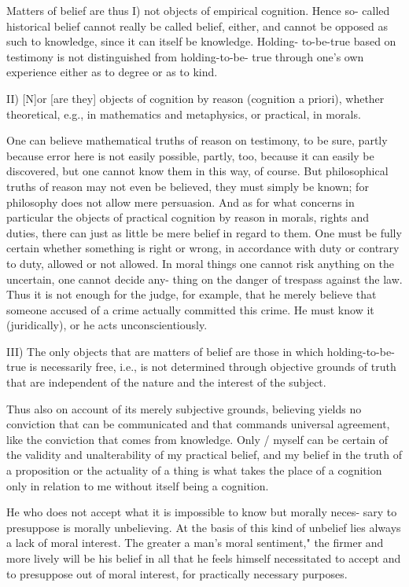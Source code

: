     Matters of belief are thus
    I) not objects of empirical cognition. Hence so-
    called historical belief cannot really be called belief, either, and cannot be
    opposed as such to knowledge, since it can itself be knowledge. Holding-
    to-be-true based on testimony is not distinguished from holding-to-be-
    true through one's own experience either as to degree or as to kind.

    II) [N]or [are they] objects of cognition by reason (cognition a priori),
    whether theoretical, e.g., in mathematics and metaphysics, or practical, in
    morals.

    One can believe mathematical truths of reason on testimony, to be sure,
    partly because error here is not easily possible, partly, too, because it can
    easily be discovered, but one cannot know them in this way, of course. But
    philosophical truths of reason may not even be believed, they must simply
    be known; for philosophy does not allow mere persuasion. And as for
    what concerns in particular the objects of practical cognition by reason in
    morals, rights and duties, there can just as little be mere belief in regard to
    them. One must be fully certain whether something is right or wrong, in
    accordance with duty or contrary to duty, allowed or not allowed. In moral
    things one cannot risk anything on the uncertain, one cannot decide any-
    thing on the danger of trespass against the law. Thus it is not enough for the
    judge, for example, that he merely believe that someone accused of a crime
    actually committed this crime. He must know it (juridically), or he acts
    unconscientiously.

    III) The only objects that are matters of belief are those in which
    holding-to-be-true is necessarily free, i.e., is not determined through
    objective grounds of truth that are independent of the nature and the
    interest of the subject.

    Thus also on account of its merely subjective grounds, believing yields
    no conviction that can be communicated and that commands universal
    agreement, like the conviction that comes from knowledge. Only / myself
    can be certain of the validity and unalterability of my practical belief, and
    my belief in the truth of a proposition or the actuality of a thing is what
    takes the place of a cognition only in relation to me without itself being a
    cognition.

    He who does not accept what it is impossible to know but morally neces-
    sary to presuppose is morally unbelieving. At the basis of this kind of
    unbelief lies always a lack of moral interest. The greater a man's moral
    sentiment," the firmer and more lively will be his belief in all that he feels
    himself necessitated to accept and to presuppose out of moral interest, for
    practically necessary purposes.

